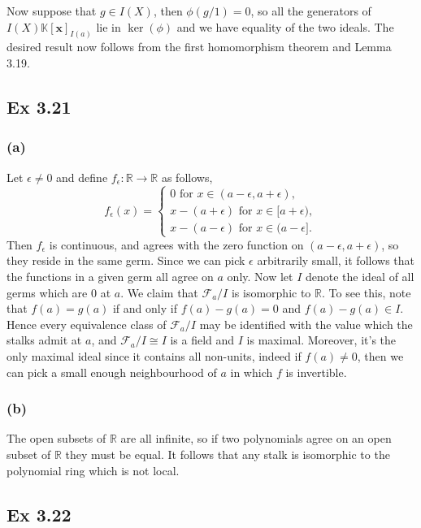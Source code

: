 \documentclass{article}
\theoremstyle{definition}
\newcommand{\R}{\mathbb{R}}
\newcommand{\K}{\mathbb{K}}
\newcommand{\Kx}{\K[\bm{x}]}
\begin{document}
Now suppose that $g \in I(X)$, then $\phi(g/1) = 0$, so all the generators of
$I(X)\Kx_{I(a)}$ lie in $\ker(\phi)$ and we have equality of the two ideals.
The desired result now follows from the first homomorphism theorem and Lemma
3.19.

\subsection*{Ex 3.21} 

\subsubsection*{(a)} 

Let $\epsilon \not = 0$ and define $f_{\epsilon} : \R \to \R$ as
follows,
\[
	f_{\epsilon}(x) = 
	\begin{cases}
		0 \text{ for } x \in (a - \epsilon, a + \epsilon), \\
		x - (a + \epsilon) \text{ for } x \in [a + \epsilon), \\
		x - (a - \epsilon) \text{ for } x \in (a - \epsilon].
	\end{cases}
\] 
Then $f_{\epsilon}$ is continuous, and agrees with the zero function on $(a -
\epsilon, a + \epsilon)$, so they reside in the same germ. Since we can pick
$\epsilon$ arbitrarily small, it follows that the functions in a given germ all
agree on $a$ only. Now let $I$ denote the ideal of all germs which are $0$ at
$a$. We claim that $\mathcal{F}_{a}/I$ is isomorphic to $\R$. To see this,
note that $f(a) = g(a)$ if and only if $f(a) - g(a) = 0$ and $f(a) - g(a) \in
I$. Hence every equivalence class of $\mathcal{F}_{a}/I$ may be identified
with the value which the stalks admit at $a$, and $\mathcal{F}_{a}/I \cong I$
is a field and $I$ is maximal. Moreover, it's the only maximal ideal since it
contains all non-units, indeed if $f(a) \not = 0$, then we can pick a small
enough neighbourhood of $a$ in which $f$ is invertible.

\subsubsection*{(b)} 
The open subsets of $\R$ are all infinite, so if two polynomials agree on an
open subset of $\R$ they must be equal. It follows that any stalk is isomorphic
to the polynomial ring which is not local.

\subsection*{Ex 3.22} 
\end{document}
